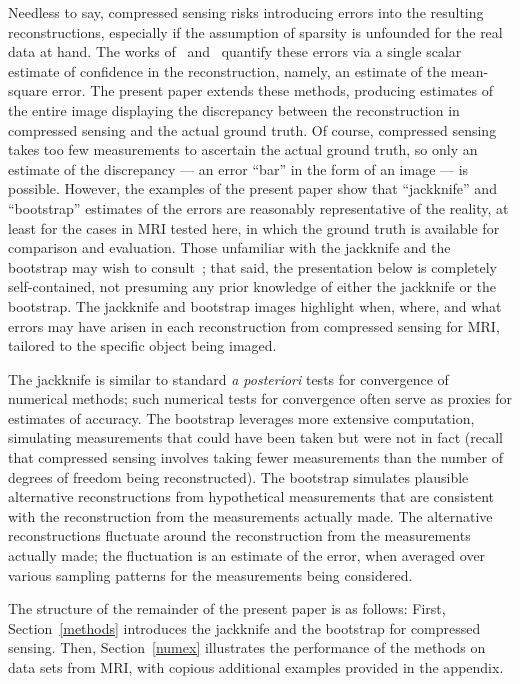 \documentclass{article}
\begin{document}
Needless to say, compressed sensing risks introducing errors
into the resulting reconstructions, especially if the assumption of sparsity
is unfounded for the real data at hand. The works
of~\cite{malioutov-sanghavi-willsky} and~\cite{ward}
quantify these errors via a single scalar estimate of confidence
in the reconstruction, namely, an estimate of the mean-square error.
The present paper extends these methods, producing estimates
of the entire image displaying the discrepancy between the reconstruction
in compressed sensing and the actual ground truth.
Of course, compressed sensing takes too few measurements to ascertain
the actual ground truth, so only an estimate of the discrepancy
--- an error ``bar'' in the form of an image --- is possible.
However, the examples of the present paper show that ``jackknife''
and ``bootstrap'' estimates of the errors are reasonably representative
of the reality, at least for the cases in MRI tested here,
in which the ground truth is available for comparison and evaluation.
Those unfamiliar with the jackknife and the bootstrap may wish
to consult~\cite{efron-tibshirani};
that said, the presentation below is completely self-contained,
not presuming any prior knowledge of either the jackknife or the bootstrap.
The jackknife and bootstrap images highlight when, where, and what errors
may have arisen in each reconstruction from compressed sensing for MRI,
tailored to the specific object being imaged.

The jackknife is similar to standard {\it a posteriori} tests for convergence
of numerical methods; such numerical tests for convergence
often serve as proxies for estimates of accuracy.
The bootstrap leverages more extensive computation, simulating measurements
that could have been taken but were not in fact
(recall that compressed sensing involves taking fewer measurements
than the number of degrees of freedom being reconstructed).
The bootstrap simulates plausible alternative reconstructions
from hypothetical measurements that are consistent
with the reconstruction from the measurements actually made.
The alternative reconstructions fluctuate around the reconstruction
from the measurements actually made;
the fluctuation is an estimate of the error,
when averaged over various sampling patterns
for the measurements being considered.

The structure of the remainder of the present paper is as follows:
First, Section~\ref{methods} introduces the jackknife and the bootstrap
for compressed sensing.
Then, Section~\ref{numex} illustrates the performance of the methods
on data sets from MRI, with copious additional examples provided
in the appendix.
\end{document}
